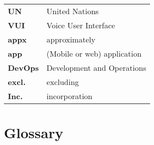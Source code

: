 \begin{flushleft}
\begin{tabular}{ll}
\textbf{UN}		&	United Nations\\

\textbf{VUI}	&	Voice User Interface\\




\hline

\textbf{appx}	&	approximately\\
\textbf{app}	&	(Mobile or web) application\\
\textbf{DevOps}	&	Development and Operations\\
\textbf{excl.}	& 	excluding\\
\textbf{Inc.}	&	incorporation\\



\end{tabular}
\end{flushleft}

\newpage
\section*{Glossary}
%

